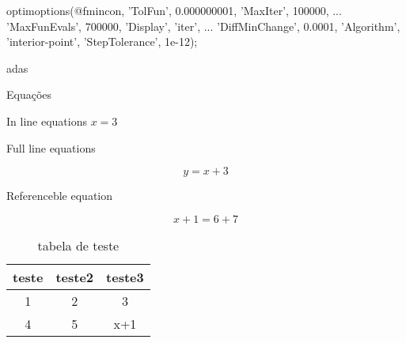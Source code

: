 optimoptions(@fmincon, 'TolFun', 0.000000001, 'MaxIter', 100000, ...
                       'MaxFunEvals', 700000, 'Display', 'iter', ...
                       'DiffMinChange', 0.0001, 'Algorithm', 'interior-point', 'StepTolerance', 1e-12);

adas


Equações

In line equations $x = 3$

Full line equations

$$y = x+3$$

Referenceble equation

\begin{equation}
\label{eq:teste}
x+1 = 6+7
\end{equation}

\begin{table}
    \begin{center}
    \caption{tabela de teste}
    \label{tab:teste}
    \begin{tabular}{c c c}
        teste & teste2 & teste3 \\ \hline
        1 & 2 & 3 \\
        4 & 5 & x+1 \\ \hline
    \end{tabular}
    \end{center}
\end{table}
                       

